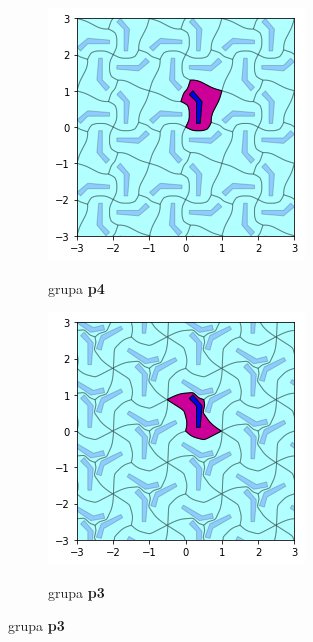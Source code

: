 \documentclass[12pt]{report}
\begin{document}
\begin{samepage}
\begin{figure}[H]
  \begin{subfigure}[b]{0.3\textwidth}
    \includegraphics[width=\textwidth]{output_21_4.png}
    \label{fig:f23}
    \caption{grupa \textbf{p4}}
  \end{subfigure}
  \begin{subfigure}[b]{0.3\textwidth}
    \includegraphics[width=\textwidth]{output_21_3.png}
    \label{fig:f22}
    \caption{grupa \textbf{p3}}
  

\end{subfigure}
\end{figure}
\end{samepage}
\end{document}
